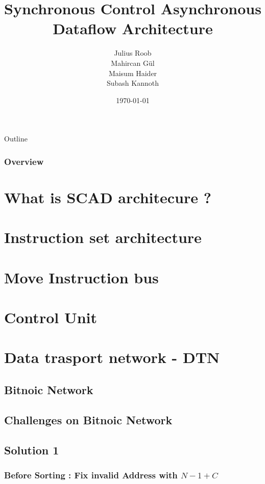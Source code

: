 \documentclass{beamer}
\title[SCAD Architecture]{Synchronous Control Asynchronous Dataflow Architecture}
\author{Julius Roob \\ Mahircan G{\"u}l \\ Maisum Haider \\ Subash Kannoth }
\institute[TU Kaiserslautern]
{
	Technische Universit{\"a}t Kaiserslautern \\
	\medskip
}
\date{\today}
\begin{document}
\begin{frame}
  \titlepage
\end{frame}

\begin{frame}[allowframebreaks]{Outline}
\frametitle{Overview}
\tableofcontents
\end{frame}

\section{What is SCAD architecure ?}
  
  
\section{Instruction set architecture}
  
  
\section{Move Instruction bus}
  
  
\section{Control Unit}
  
  
\section{Data trasport network - DTN}
  
  
  \subsection{Bitnoic Network}
     \subsection{Challenges on Bitnoic Network}
    
      \subsection{Solution 1}
      
	\subsubsection{Before Sorting : Fix invalid Address with $N - 1 + C$ }
	
\end{document}
